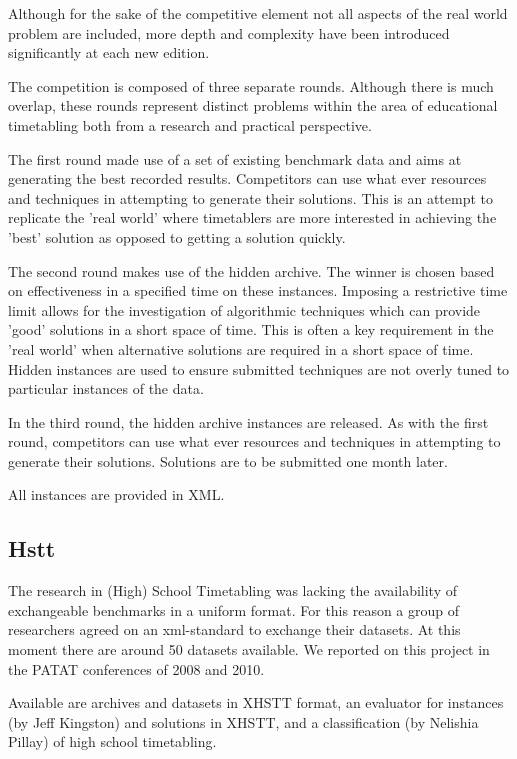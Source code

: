 Although for the sake of the competitive element not all aspects of the real world problem are included, more depth and complexity have been introduced significantly at each new edition.

The competition is composed of three separate rounds. Although there is much overlap, these rounds represent distinct problems within the area of educational timetabling both from a research and practical perspective.

The first round made use of a set of existing benchmark data and aims at generating the best recorded results. Competitors can use what ever resources and techniques in attempting to generate their solutions. This is an attempt to replicate the 'real world' where timetablers are more interested in achieving the 'best' solution as opposed to getting a solution quickly.

The second round makes use of the hidden archive. The winner is chosen based on effectiveness in a specified time on these instances. Imposing a restrictive time limit allows for the investigation of algorithmic techniques which can provide 'good' solutions in a short space of time. This is often a key requirement in the 'real world' when alternative solutions are required in a short space of time. Hidden instances are used to ensure submitted techniques are not overly tuned to particular instances of the data.

In the third round, the hidden archive instances are released. As with the first round, competitors can use what ever resources and techniques in attempting to generate their solutions. Solutions are to be submitted one month later.

All instances are provided in XML.


\subsection{Hstt}
\label{hstt}

The research in (High) School Timetabling was lacking the availability of exchangeable benchmarks in a uniform format. For this reason a group of researchers agreed on an xml-standard to exchange their datasets. At this moment there are around 50 datasets available. We reported on this project in the PATAT conferences of 2008 and 2010.

Available are archives and datasets in XHSTT format, an evaluator for instances (by Jeff Kingston) and solutions in XHSTT, and a classification (by Nelishia Pillay) of high school timetabling.

